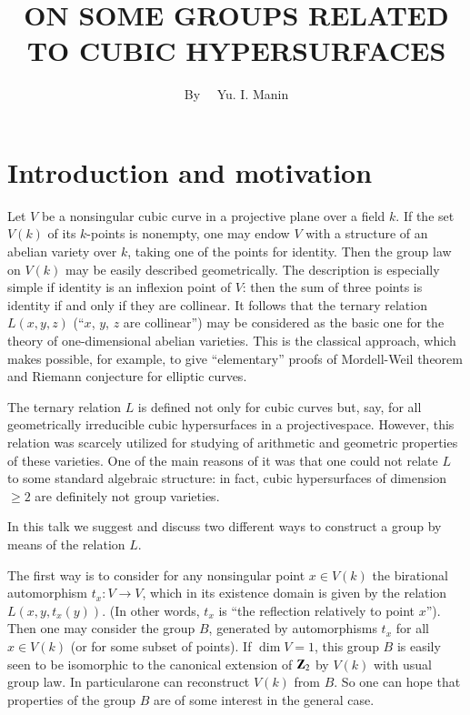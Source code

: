 \title{ON SOME GROUPS RELATED TO CUBIC HYPERSURFACES}

\author{By~~ Yu. I. Manin}

\date{}

\maketitle

\setcounter{pageoriginal}{254}
\section*{Introduction and motivation}
\pageoriginale

Let $V$ be a nonsingular cubic curve in a projective plane over a field $k$. If the set $V(k)$ of its $k$-points is nonempty, one may endow $V$ with a structure of an abelian variety over $k$, taking one of the points for identity. Then the group law on $V(k)$ may be easily described geometrically. The description is especially simple if identity is an inflexion point of $V$: then the sum of three points is identity if and only if they are collinear. It follows that the ternary relation $L(x,y,z)$ (``$x$, $y$, $z$ are collinear'') may be considered as the basic one for the theory of one-dimensional abelian varieties. This is the classical approach, which makes possible, for example, to give ``elementary'' proofs of Mordell-Weil theorem and Riemann conjecture for elliptic curves.

The ternary relation $L$ is defined not only for cubic curves but, say, for all geometrically irreducible cubic hypersurfaces in a projective\break space. However, this relation was scarcely utilized for studying of arithmetic and geometric properties of these varieties. One of the main reasons of it was that one could not relate $L$ to some standard algebraic structure: in fact, cubic hypersurfaces of dimension $\geq 2$ are definitely not group varieties.

In this talk we suggest and discuss two different ways to construct a group by means of the relation $L$.

The first way is to consider for any nonsingular point $x\in V(k)$ the birational automorphism $t_{x}:V\to V$, which in its existence domain is given by the relation $L(x,y,t_{x}(y))$. (In other words, $t_{x}$ is ``the reflection relatively to point $x$''). Then one may consider the group $B$, generated by automorphisms $t_{x}$ for all $x\in V(k)$ (or for some subset of points). If $\dim V=1$, this group $B$ is easily seen to be isomorphic to the canonical extension of $\mathbf{Z}_{2}$ by $V(k)$ with usual group law. In particular\pageoriginale one can reconstruct $V(k)$ from $B$. So one can hope that properties of the group $B$ are of some interest in the general case.

